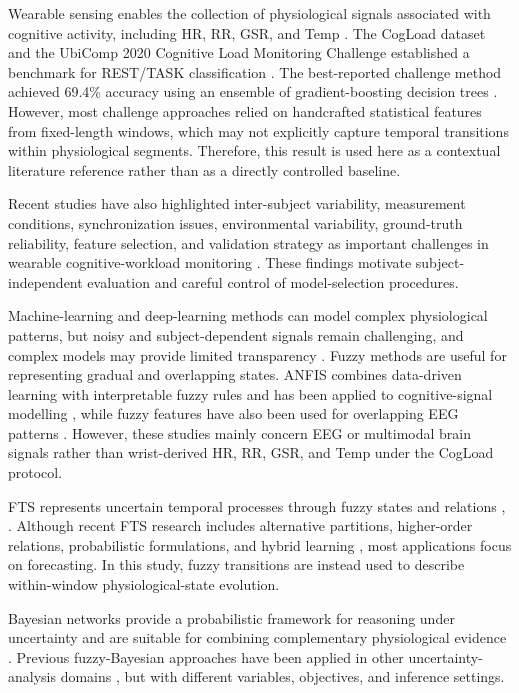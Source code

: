 \documentclass[runningheads]{llncs}
\begin{document}
Wearable sensing enables the collection of physiological signals associated with cognitive activity, including HR, RR, GSR, and Temp \cite{ref2}. The CogLoad dataset and the UbiComp 2020 Cognitive Load Monitoring Challenge established a benchmark for REST/TASK classification \cite{ref3}. The best-reported challenge method achieved 69.4\% accuracy using an ensemble of gradient-boosting decision trees \cite{ref3}. However, most challenge approaches relied on handcrafted statistical features from fixed-length windows, which may not explicitly capture temporal transitions within physiological segments. Therefore, this result is used here as a contextual literature reference rather than as a directly controlled baseline.

Recent studies have also highlighted inter-subject variability, measurement conditions, synchronization issues, environmental variability, ground-truth reliability, feature selection, and validation strategy as important challenges in wearable cognitive-workload monitoring \cite{ref9,ref10,ref11}. These findings motivate subject-independent evaluation and careful control of model-selection procedures.

Machine-learning and deep-learning methods can model complex physiological patterns, but noisy and subject-dependent signals remain challenging, and complex models may provide limited transparency \cite{ref12}. Fuzzy methods are useful for representing gradual and overlapping states. ANFIS combines data-driven learning with interpretable fuzzy rules \cite{ref7} and has been applied to cognitive-signal modelling \cite{ref13}, while fuzzy features have also been used for overlapping EEG patterns \cite{ref14}. However, these studies mainly concern EEG or multimodal brain signals rather than wrist-derived HR, RR, GSR, and Temp under the CogLoad protocol.

FTS represents uncertain temporal processes through fuzzy states and relations \cite{ref5}, \cite{ref6}. Although recent FTS research includes alternative partitions, higher-order relations, probabilistic formulations, and hybrid learning \cite{ref15}, most applications focus on forecasting. In this study, fuzzy transitions are instead used to describe within-window physiological-state evolution.

Bayesian networks provide a probabilistic framework for reasoning under uncertainty and are suitable for combining complementary physiological evidence \cite{ref8}. Previous fuzzy-Bayesian approaches have been applied in other uncertainty-analysis domains \cite{ref16}, but with different variables, objectives, and inference settings.
\end{document}
